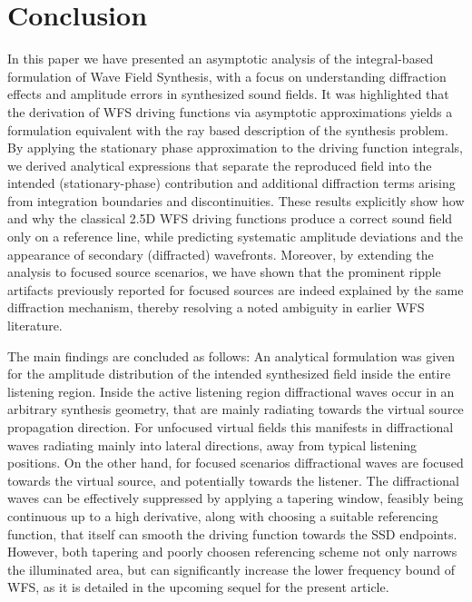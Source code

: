 \documentclass[lettersize,journal]{IEEEtran}
\begin{document}
\section{Conclusion}
In this paper we have presented an asymptotic analysis of the integral-based formulation of Wave Field Synthesis, with a focus on understanding diffraction effects and amplitude errors in synthesized sound fields. 
It was highlighted that the derivation of WFS driving functions via asymptotic approximations yields a formulation equivalent with the ray based description of the synthesis problem.
By applying the stationary phase approximation to the driving function integrals, we derived analytical expressions that separate the reproduced field into the intended (stationary-phase) contribution and additional diffraction terms arising from integration boundaries and discontinuities. 
These results explicitly show how and why the classical 2.5D WFS driving functions produce a correct sound field only on a reference line, while predicting systematic amplitude deviations and the appearance of secondary (diffracted) wavefronts. 
Moreover, by extending the analysis to focused source scenarios, we have shown that the prominent ripple artifacts previously reported for focused sources are indeed explained by the same diffraction mechanism, thereby resolving a noted ambiguity in earlier WFS literature.

The main findings are concluded as follows:
An analytical formulation was given for the amplitude distribution of the intended synthesized field inside the entire listening region.
Inside the active listening region diffractional waves occur in an arbitrary synthesis geometry, that are mainly radiating towards the virtual source propagation direction.
For unfocused virtual fields this manifests in diffractional waves radiating mainly into lateral directions, away from typical listening positions.
On the other hand, for focused scenarios diffractional waves are focused towards the virtual source, and potentially towards the listener.
The diffractional waves can be effectively suppressed by applying a tapering window, feasibly being continuous up to a high derivative, along with choosing a suitable referencing function, that itself can smooth the driving function towards the SSD endpoints. 
However, both tapering and poorly choosen referencing scheme not only narrows the illuminated area, but can significantly increase the lower frequency bound of WFS, as it is detailed in the upcoming sequel for the present article.
\end{document}
